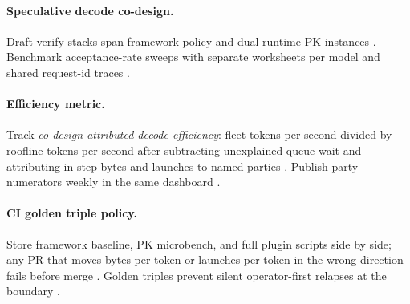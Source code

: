\paragraph{Speculative decode co-design.} Draft-verify stacks span framework policy and dual runtime PK instances \citep{patel2025llminference,kwon2023vllm,yirage2026,chen2020compilerbasedhardw,memoryfloor2026,taxbreak2026,liu2024deepseekv3,nvidia2024cudagraphs,dao2022flashattention,amd2024xdna,amd2024aie,dlbook,dao2023flashdecoding,nvidia2022hopper,semianalysis2024tma}. Benchmark acceptance-rate sweeps with separate worksheets per model and shared request-id traces \citep{yirage2026,kwon2023vllm,patel2025llminference,chen2020compilerbasedhardw,memoryfloor2026,taxbreak2026,liu2024deepseekv3,nvidia2024cudagraphs,dao2022flashattention,amd2024aie,amd2024xdna,dlbook,dao2023flashdecoding,nvidia2022hopper,semianalysis2024tma}.

\paragraph{Efficiency metric.} Track \emph{co-design-attributed decode efficiency}: fleet tokens per second divided by roofline tokens per second after subtracting unexplained queue wait and attributing in-step bytes and launches to named parties \citep{patel2025llminference,taxbreak2026,memoryfloor2026,yirage2026,chen2020compilerbasedhardw,kwon2023vllm,liu2024deepseekv3,nvidia2024cudagraphs,dao2022flashattention,amd2024aie,amd2024xdna,dlbook,dao2023flashdecoding,nvidia2022hopper,semianalysis2024tma}. Publish party numerators weekly in the same dashboard \citep{yirage2026,patel2025llminference,chen2020compilerbasedhardw,kwon2023vllm,memoryfloor2026,taxbreak2026,dlbook}.

\paragraph{CI golden triple policy.} Store framework baseline, PK microbench, and full plugin scripts side by side; any PR that moves bytes per token or launches per token in the wrong direction fails before merge \citep{taxbreak2026,memoryfloor2026,yirage2026,chen2020compilerbasedhardw,patel2025llminference,kwon2023vllm,liu2024deepseekv3,nvidia2024cudagraphs,dao2022flashattention,amd2024aie,amd2024xdna,dlbook,dao2023flashdecoding,nvidia2022hopper,semianalysis2024tma}. Golden triples prevent silent operator-first relapses at the boundary \citep{patel2025llminference,yirage2026,chen2020compilerbasedhardw,memoryfloor2026,taxbreak2026,kwon2023vllm,dlbook}.


